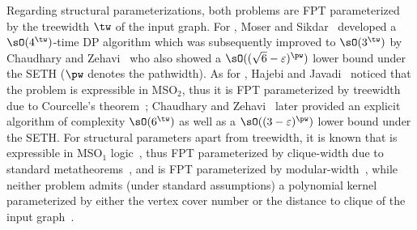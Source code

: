 Regarding structural parameterizations, both problems are FPT parameterized by the treewidth $\tw$ of the input graph.
For \InducedM, Moser and Sikdar~\cite{dam/MoserS09} developed a $\sO(4^{\tw})$-time DP algorithm
which was subsequently improved to $\sO(3^{\tw})$ by Chaudhary and Zehavi~\cite{wg/ChaudharyZ23a}
who also showed a $\sO((\sqrt{6}-\varepsilon)^{\pw})$ lower bound under the SETH ($\pw$ denotes the pathwidth).
As for \AcyclicM, Hajebi and Javadi~\cite{tcs/HajebiJ23} noticed that the problem is expressible in MSO$_2$,
thus it is FPT parameterized by treewidth due to Courcelle's theorem~\cite{iandc/Courcelle90};
Chaudhary and Zehavi~\cite{wg/ChaudharyZ23a} later provided an explicit algorithm of complexity $\sO(6^{\tw})$
as well as a $\sO((3-\varepsilon)^{\pw})$ lower bound under the SETH.
For structural parameters apart from treewidth,
it is known that {\InducedM} is expressible in MSO$_1$ logic~\cite{algorithmica/KoblerR03},
thus FPT parameterized by clique-width due to standard metatheorems~\cite{mst/CourcelleMR00},
and {\AcyclicM} is FPT parameterized by modular-width~\cite{tcs/HajebiJ23},
while neither problem admits (under standard assumptions) a polynomial kernel parameterized by
either the vertex cover number or the distance to clique of the input graph~\cite{jcss/ChaudharyZ25,tcs/GomesMPSS23}.
